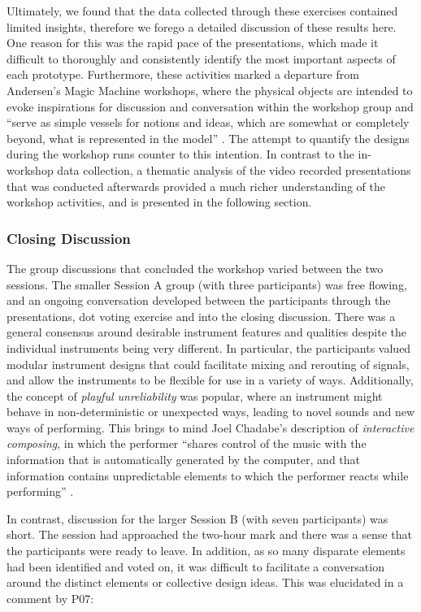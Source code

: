 \documentclass[letterpaper, 12pt]{article}
\begin{document}
Ultimately, we found that the data collected through these exercises contained limited insights, therefore we forego a detailed discussion of these results here. One reason for this was the rapid pace of the presentations, which made it difficult to thoroughly and consistently identify the most important aspects of each prototype. Furthermore, these activities marked a departure from Andersen's Magic Machine workshops, where the physical objects are intended to evoke inspirations for discussion and conversation within the workshop group and ``serve as simple vessels for notions and ideas, which are somewhat or completely beyond, what is represented in the model'' \citep[p. 63]{Andersen2017}. The attempt to quantify the designs during the workshop runs counter to this intention. In contrast to the in-workshop data collection, a thematic analysis of the video recorded presentations that was conducted afterwards provided a much richer understanding of the workshop activities, and is presented in the following section.

\subsubsection{Closing Discussion}

The group discussions that concluded the workshop varied between the two sessions. The smaller Session A group (with three participants) was free flowing, and an ongoing conversation developed between the participants through the presentations, dot voting exercise and into the closing discussion. There was a general consensus around desirable instrument features and qualities despite the individual instruments being very different. In particular, the participants valued modular instrument designs that could facilitate mixing and rerouting of signals, and allow the instruments to be flexible for use in a variety of ways. Additionally, the concept of \emph{playful unreliability} was popular, where an instrument might behave in non-deterministic or unexpected ways, leading to novel sounds and new ways of performing. This brings to mind Joel Chadabe's description of \emph{interactive composing}, in which the performer ``shares control of the music with the information that is automatically generated by the computer, and that information contains unpredictable elements to which the performer reacts while performing'' \citep[p. 23]{Chadabe1984}.

In contrast, discussion for the larger Session B (with seven participants) was short. The session had approached the two-hour mark and there was a sense that the participants were ready to leave. In addition, as so many disparate elements had been identified and voted on, it was difficult to facilitate a conversation around the distinct elements or collective design ideas. This was elucidated in a comment by P07:
\end{document}
